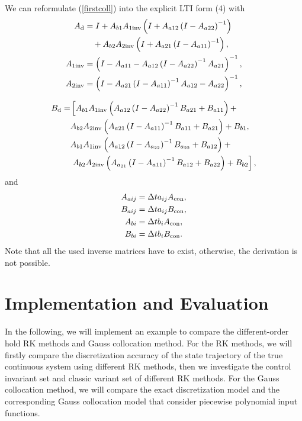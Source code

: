 We can reformulate (\ref{firstcoll}) into the explicit LTI form (4)
with
\begin{equation}
	\begin{split}
    	A_{\rm{d}}&=I+A_{b1}  A_{\rm{1inv}}  \left( I+ A_{a12} \left(I-A_{a22}\right)^{-1} \right) \\ & \quad+A_{b2}  A_{\rm{2inv}}  \left(I+A_{a21} \left(I-A_{a11}\right)^{-1}\right),\\
    	A_{\rm{1i n v}}&=\left(  I-A_{a11}-A_{a12}  \left(I-A_{a22}\right)^{-1}  A_{a21}\right)^{-1},\\
    	A_{\rm{2 i n v}} &=\left(I-A_{a21} \left(I-A_{a11}\right)^{-1}  A_{a12}-A_{a22}\right)^{-1},
	\end{split}
\end{equation}

\begin{equation}
	\begin{split} 
		B_{\rm{d}}=&\left[A_{b 1}  A_{\rm{1inv}} \left(A_{a 12} \left(I-A_{a 22}\right)^{-1}  B_{a 21}+B_{a 11}\right)+\right. \\
		&A_{b 2}  A_{\rm{2 i n v}} \left(A_{a 21} \left(I-A_{a 11}\right)^{-1}  B_{a 11}+B_{a 21}\right)+B_{b 1} ,\\
		&A_{b1}  A_{\rm{1inv}} \left(A_{a 12} \left(I-A_{a_{22}}\right)^{-1}  B_{a_{22}}+B_{a 12}\right)+\left. \right.\\
		&\left.A_{b 2}  A_{\rm{2 i n v}} \left(A_{a_{21}} \left(I-A_{a 11}\right)^{-1}  B_{a 12}+B_{a 22}\right)+B_{b 2}\right],
	\end{split}
\end{equation}
and
\begin{equation}
	\begin{split}
        A_{a i j} &=\Delta t  a_{i j}  A_{\rm{c o n}}, \\
        B_{a i j} &=\Delta t  a_{i j}  B_{\rm{c o n}}, \\
        A_{b i} &=\Delta t  b_{i}  A_{\rm{c o n}}, \\
        B_{b i} &=\Delta t  b_{i}  B_{\rm{c o n}}. \\
	\end{split}
\end{equation}
Note that all the used inverse matrices have to exist, otherwise, the derivation is not possible.
\section{Implementation and Evaluation}
In the following, we will implement an example to compare the different-order hold RK methods and Gauss collocation method. For the RK methods, we will firstly compare the discretization accuracy of the state trajectory of the true continuous system using different RK methods, then we investigate the control invariant set and classic variant set of different RK methods. For the Gauss collocation method, we will compare the exact discretization model and the corresponding Gauss collocation model that consider piecewise polynomial input functions.
